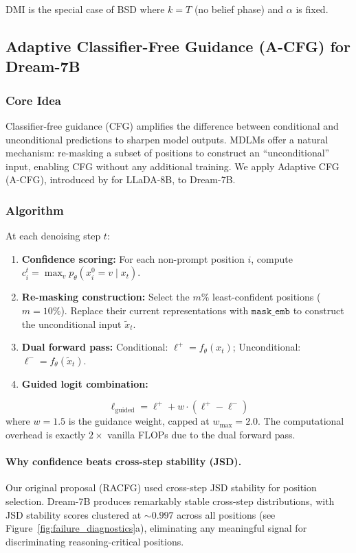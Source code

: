 \documentclass{article}
\begin{document}
DMI is the special case of BSD where $k = T$ (no belief phase) and $\alpha$ is fixed.

\subsection{Adaptive Classifier-Free Guidance (A-CFG) for Dream-7B}
\label{sec:acfg}

\subsubsection{Core Idea}

Classifier-free guidance (CFG) amplifies the difference between conditional and unconditional predictions to sharpen model outputs. MDLMs offer a natural mechanism: re-masking a subset of positions to construct an ``unconditional'' input, enabling CFG without any additional training. We apply Adaptive CFG (A-CFG), introduced by \citet{arriola2025acfg} for LLaDA-8B, to Dream-7B.

\subsubsection{Algorithm}

At each denoising step $t$:
\begin{enumerate}
\item \textbf{Confidence scoring:} For each non-prompt position $i$, compute $c_i^t = \max_v p_\theta(x_i^0 = v \mid x_t)$.
\item \textbf{Re-masking construction:} Select the $m\%$ least-confident positions ($m = 10\%$). Replace their current representations with $\texttt{mask\_emb}$ to construct the unconditional input $\tilde{x}_t$.
\item \textbf{Dual forward pass:} Conditional: $\ell^+ = f_\theta(x_t)$; Unconditional: $\ell^- = f_\theta(\tilde{x}_t)$.
\item \textbf{Guided logit combination:}
\end{enumerate}
\begin{equation}
\ell_{\text{guided}} = \ell^+ + w \cdot (\ell^+ - \ell^-)
\label{eq:cfg}
\end{equation}
where $w = 1.5$ is the guidance weight, capped at $w_{\max} = 2.0$. The computational overhead is exactly $2{\times}$ vanilla FLOPs due to the dual forward pass.

\paragraph{Why confidence beats cross-step stability (JSD).} Our original proposal (RACFG) used cross-step JSD stability for position selection. Dream-7B produces remarkably stable cross-step distributions, with JSD stability scores clustered at ${\sim}0.997$ across all positions (see Figure~\ref{fig:failure_diagnostics}a), eliminating any meaningful signal for discriminating reasoning-critical positions.
\end{document}
